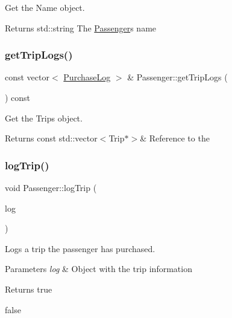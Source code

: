 Get the Name object. 

\begin{DoxyReturn}{Returns}
std\+::string The \mbox{\hyperlink{classPassenger}{Passenger}}\textquotesingle{}s name 
\end{DoxyReturn}
\mbox{\label{classPassenger_a4d8911ca0e8fe1d9226594674bd04af4}} 
\subsubsection{\texorpdfstring{get\+Trip\+Logs()}{getTripLogs()}}
{\footnotesize\ttfamily const vector$<$ \mbox{\hyperlink{classPurchaseLog}{Purchase\+Log}} $>$ \& Passenger\+::get\+Trip\+Logs (\begin{DoxyParamCaption}{ }\end{DoxyParamCaption}) const}



Get the Trips object. 

\begin{DoxyReturn}{Returns}
const std\+::vector$<$\+Trip$\ast$$>$\& Reference to the 
\end{DoxyReturn}
\mbox{\label{classPassenger_ad61aeee59fcdb0084a6cc12d16305d12}} 
\subsubsection{\texorpdfstring{log\+Trip()}{logTrip()}}
{\footnotesize\ttfamily void Passenger\+::log\+Trip (\begin{DoxyParamCaption}\item[{\mbox{\hyperlink{classPurchaseLog}{Purchase\+Log}}}]{log }\end{DoxyParamCaption})}



Logs a trip the passenger has purchased. 


\begin{DoxyParams}{Parameters}
{\em log} & Object with the trip information \\
\hline
\end{DoxyParams}
\begin{DoxyReturn}{Returns}
true 

false 
\end{DoxyReturn}
\mbox{\label{classPassenger_a72e4042544557a3dd9c02198aa2582d8}} 
